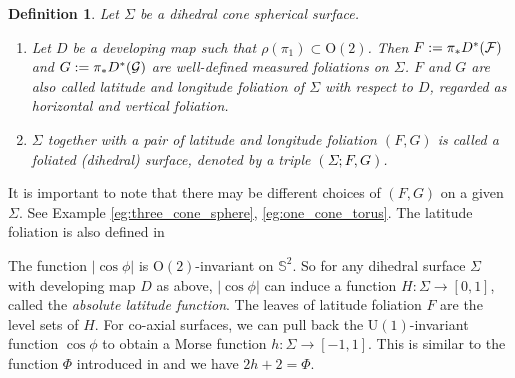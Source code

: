 \documentclass[pdflatex,sn-mathphys]{sn-jnl}%
\numberwithin{equation}{section}
\theoremstyle{thmstyleone}%
\newtheorem{definition}[theorem]{Definition}
\newcommand{\abs}[1]{\left\lvert #1 \right\rvert}
\newcommand{\STwo}{\mathbb{S}^2}
\newcommand{\Uone}{\mathrm{U}(1)}
\newcommand{\Otwo}{\mathrm{O}(2)}
\newcommand{\mfoli}{measured foliation}
\newcommand{\csphsf}{cone spherical surface}
\newcommand{\SYM}{\textcolor{black}}
\newcommand{\DEF}{\emph}
\begin{document}
\begin{definition}\label{def:LL_foli}
Let $\Sigma$ be a dihedral \csphsf. %
\begin{enumerate}
    \item Let $D$ be a developing map such that $\rho(\pi_1)\subset \Otwo$. 
    Then $\SYM{F}:=\pi_* D^*(\FoliLati)$ and $\SYM{G}:=\pi_* D^*(\FoliLogi)$ are well-defined \mfoli s on $\Sigma$.
    $F$ and $G$ are also called \DEF{latitude and longitude foliation} of $\Sigma$ with respect to $D$, regarded as horizontal and vertical foliation.
    \item %
    $\Sigma$ together with a pair of latitude and longitude foliation $(F,G)$ is called a \DEF{foliated (dihedral) surface}, denoted by a triple \SYM{$(\Sigma;F,G)$}.
\end{enumerate}
\end{definition}

It is important to note that there may be different choices of $(F,G)$ on a given $\Sigma$. See Example \ref{eg:three_cone_sphere}, \ref{eg:one_cone_torus}.
The latitude foliation is also defined in \cite[Section 2.2]{GT23}

The function $\abs{\cos\phi}$ is $\Otwo$-invariant on $\STwo$. So for any dihedral surface $\Sigma$ with developing map $D$ as above, $\abs{\cos\phi}$ can induce a function $H:\Sigma\to[0,1]$, called the \DEF{absolute latitude function}. The leaves of latitude foliation $F$ are the level sets of $H$. For co-axial surfaces, we can pull back the $\Uone$-invariant function $\cos\phi$ to obtain a Morse function $h:\Sigma\to[-1,1]$. This is similar to the function $\Phi$ introduced in \cite{CWWX15,WWX22axv} and we have $2h+2=\Phi$.
\end{document}
